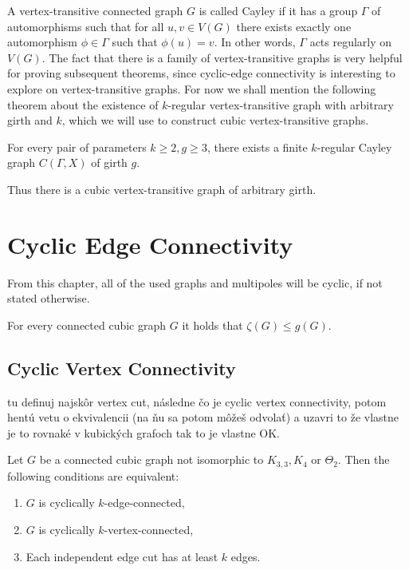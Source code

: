 \documentclass[12pt, twoside]{book}
\begin{document}
A vertex-transitive connected graph $G$ is called Cayley if it has a group $\Gamma$ of automorphisms such that for all $u, v \in V(G)$ there exists exactly one automorphism $\phi\in\Gamma$ such that $\phi(u)=v$. In other words, $\Gamma$ acts regularly on $V(G)$. The fact that there is a family of vertex-transitive graphs is very helpful for proving subsequent theorems, since cyclic-edge connectivity is interesting to explore on vertex-transitive graphs. For now we shall mention the following theorem about the existence of $k$-regular vertex-transitive graph with arbitrary girth and $k$, which we will use to construct cubic vertex-transitive graphs.

\begin{theorem}\label{th:cayley-girth-regular}
	For every pair of parameters $k \geq 2, g \geq 3$, there exists a finite $k$-regular Cayley graph $C(\Gamma, X)$ of girth $g$.
\end{theorem}

Thus there is a cubic vertex-transitive graph of arbitrary girth.

\chapter{Cyclic Edge Connectivity}\label{ch:cyclic-edge-connectivity}

From this chapter, all of the used graphs and multipoles will be cyclic, if not stated otherwise.

\begin{proposition}\label{prop:cyclic-con-less-than-girth}
	For every connected cubic graph $G$ it holds that $\zeta(G)\leq g(G)$.
\end{proposition}

\section{Cyclic Vertex Connectivity}

\todo{} tu definuj najskôr vertex cut, následne čo je cyclic vertex connectivity, potom hentú vetu o ekvivalencii (na ňu sa potom môžeš odvolať) a uzavri to že vlastne je to rovnaké v kubických grafoch tak to je vlastne OK.

\begin{theorem}
	Let $G$ be a connected cubic graph not isomorphic to $K_{3,3},K_4$ or $\Theta_2$. Then the following conditions are equivalent:
	\begin{enumerate}
		\item $G$ is cyclically $k$-edge-connected,
		\item $G$ is cyclically $k$-vertex-connected,
		\item Each independent edge cut has at least $k$ edges.
	\end{enumerate}
\end{theorem}
\end{document}
